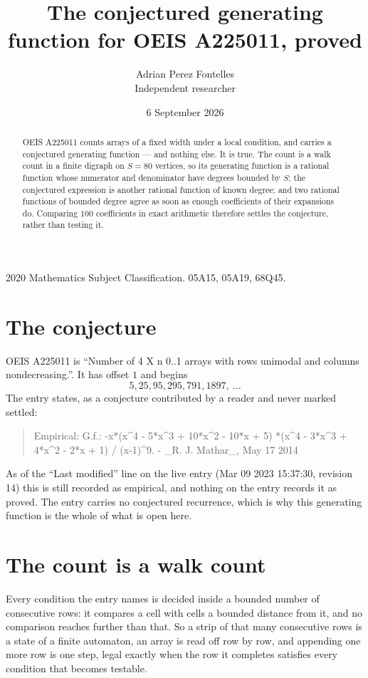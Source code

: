 \documentclass[11pt,a4paper]{article}
\title{The conjectured generating function for OEIS A225011, proved}
\author{Adrian Perez Fontelles\\ \small Independent researcher}
\date{6 September 2026}
\theoremstyle{plain}
\theoremstyle{definition}
\begin{document}
\maketitle

\begin{abstract}
OEIS A225011 counts arrays of a fixed width under a local condition, and carries a conjectured
generating function --- and nothing else. It is true. The count is a walk count in a finite
digraph on $S=80$ vertices, so its generating function is a rational function whose numerator
and denominator have degrees bounded by $S$; the conjectured expression is another rational
function of known degree; and two rational functions of bounded degree agree as soon as enough
coefficients of their expansions do. Comparing $100$ coefficients in exact arithmetic
therefore settles the conjecture, rather than testing it.
\end{abstract}

\noindent\small 2020 Mathematics Subject Classification. 05A15, 05A19, 68Q45.\normalsize

\section{The conjecture}

OEIS A225011 is ``Number of 4 X n 0..1 arrays with rows unimodal and columns nondecreasing.''. It has offset $1$ and begins
\[
5, 25, 95, 295, 791, 1897,\ \dots
\]
The entry states, as a conjecture contributed by a reader and never marked settled:
\begin{quote}
Empirical: G.f.: -x*(x\^{}4 - 5*x\^{}3 + 10*x\^{}2 - 10*x + 5) *(x\^{}4 - 3*x\^{}3 + 4*x\^{}2 - 2*x + 1) / (x-1)\^{}9. - \_R. J. Mathar\_, May 17 2014
\end{quote}
As of the ``Last modified'' line on the live entry (Mar 09 2023 15:37:30, revision 14) this is still
recorded as empirical, and nothing on the entry records it as proved. The entry carries no
conjectured recurrence, which is why this generating function is the whole of what is open
here.

\section{The count is a walk count}

Every condition the entry names is decided inside a bounded number of consecutive rows: it
compares a cell with cells a bounded distance from it, and no comparison reaches further than
that. So a strip of that many consecutive rows is a state of a finite automaton, an array is
read off row by row, and appending one more row is one step, legal exactly when the row it
completes satisfies every condition that becomes testable.
\end{document}
